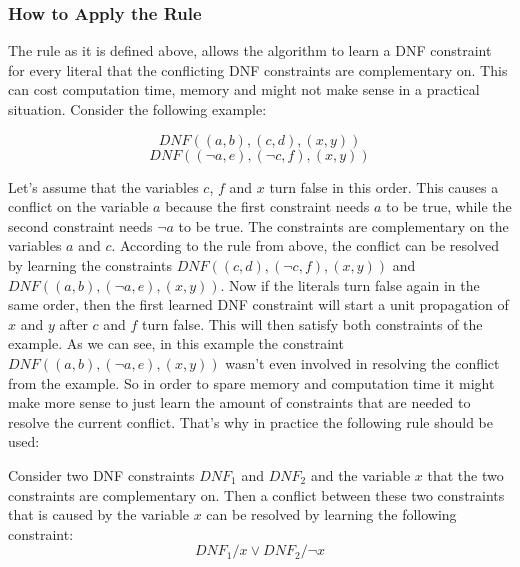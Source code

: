 \subsubsection{How to Apply the Rule}

The rule as it is defined above, allows the algorithm to learn a DNF constraint for every literal that the conflicting DNF constraints are complementary on. This can cost computation time, memory and might not make sense in a practical situation. Consider the following example:

\begin{leftbar}
\begin{displaymath}
DNF((a,b),(c,d),(x,y))
\end{displaymath}
\begin{displaymath}
DNF((\neg a, e),(\neg c, f), (x,y))
\end{displaymath}
\end{leftbar}

Let's assume that the variables $c$, $f$ and $x$ turn false in this order. This causes a conflict on the variable $a$ because the first constraint needs $a$ to be true, while the second constraint needs $\neg a$ to be true. The constraints are complementary on the variables $a$ and $c$. According to the rule from above, the conflict can be resolved by learning the constraints $DNF((c,d),(\neg c, f),(x,y))$ and $DNF((a,b),(\neg a, e),(x,y))$. Now if the literals turn false again in the same order, then the first learned DNF constraint will start a unit propagation of $x$ and $y$ after $c$ and $f$ turn false. This will then satisfy both constraints of the example. As we can see, in this example the constraint $DNF((a,b),(\neg a, e),(x,y))$ wasn't even involved in resolving the conflict from the example. So in order to spare memory and computation time it might make more sense to just learn the amount of constraints that are needed to resolve the current conflict. That's why in practice the following rule should be used:

\begin{leftbar}
Consider two DNF constraints $DNF_1$ and $DNF_2$ and the variable $x$ that the two constraints are complementary on. Then a conflict between these two constraints that is caused by the variable $x$ can be resolved by learning the following constraint:
\begin{displaymath}
DNF_1 / x \vee DNF_2 / \neg x
\end{displaymath}
\end{leftbar}

